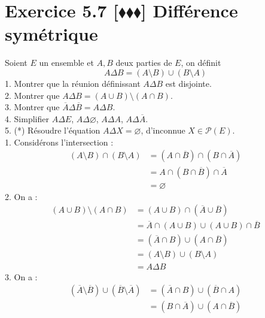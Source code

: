 \documentclass[10pt]{article}
\begin{document}
\section*{Exercice 5.7 [$\blacklozenge\blacklozenge\blacklozenge$] Différence symétrique}
\begin{tcolorbox}[enhanced, width=7in, center, size=fbox, fontupper=\large, drop shadow southwest]
    Soient $E$ un ensemble et $A,B$ deux parties de $E$, on définit 
    \begin{equation*}
        A \Delta B = (A \setminus B) \cup (B \setminus A)
    \end{equation*}
    1. Montrer que la réunion définissant $A \Delta B$ est disjointe.\\
    2. Montrer que $A \Delta B = (A \cup B) \setminus (A \cap B)$.\\
    3. Montrer que $\overline{A} \Delta \overline{B} = A \Delta B$.\\
    4. Simplifier $A \Delta E$, $A \Delta \varnothing$, $A \Delta A$, $A \Delta \overline{A}$.\\
    5. (*) Résoudre l'équation $A \Delta X = \varnothing$, d'inconnue $X \in \mathcal{P}(E)$.\\[0.25cm]
    1. Considérons l'intersection :
    \begin{align*}
        (A \setminus B) \cap (B \setminus A) &= (A \cap \overline{B}) \cap (B \cap \overline{A})\\
        &=A \cap (B \cap \overline{B}) \cap \overline{A}\\
        &=\varnothing
    \end{align*}
    2. On a :
    \begin{align*}
        (A \cup B) \setminus (A \cap B) &= (A \cup B) \cap (\overline{A} \cup \overline{B})\\
        &=\overline{A} \cap (A \cup B) \cup (A \cup B) \cap \overline{B}\\
        &=(\overline{A} \cap B) \cup (A \cap \overline{B})\\
        &=(A \setminus B) \cup (B \setminus A)\\
        &=A \Delta B
    \end{align*}
    3. On a :
    \begin{align*}
        (\overline{A} \setminus \overline{B}) \cup (\overline{B} \setminus \overline{A}) &= (\overline{A} \cap B) \cup (\overline{B} \cap A)\\
        &=(B \cap \overline{A}) \cup (A \cap \overline{B})\\

\end{align*}
\end{tcolorbox}
\end{document}
